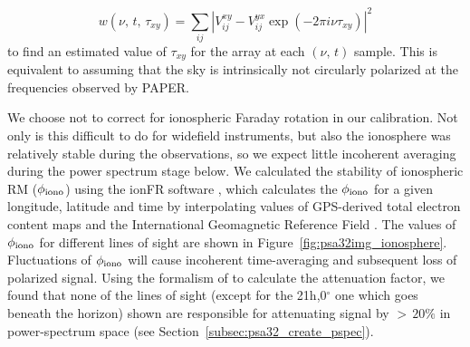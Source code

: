 \begin{equation}
w(\nu,\,t,\,\tau_{xy}) = \sum_{ij} | V_{ij}^{xy} - V_{ij}^{yx}\exp(-2\pi i \nu \tau_{xy}) |^2
\end{equation}
to find an estimated value of $\tau_{xy}$ for the array at each $(\nu,\,t)$ sample. This is equivalent to assuming that the sky is intrinsically not circularly polarized at the frequencies observed by PAPER.

We choose not to correct for ionospheric Faraday rotation in our calibration. Not only is this difficult to do for widefield instruments, but also the ionosphere was relatively stable during the observations, so we expect little incoherent averaging during the power spectrum stage below. We calculated the stability of ionospheric RM ($\phi_{\rm iono}$) using the {\sc ionFR} software \citep{Sotomayor-Beltran.13}, which calculates the $\phi_{\rm iono}$ for a given longitude, latitude and time by interpolating values of GPS-derived total electron content maps and the International Geomagnetic Reference Field \citep{Finlay.10}. The values of $\phi_{\rm iono}$ for different lines of sight are shown in Figure~\ref{fig:psa32img_ionosphere}. 
Fluctuations of $\phi_{\rm iono}$ will cause incoherent time-averaging and subsequent loss of polarized signal. Using the formalism of \citet{Moore.15} to calculate the attenuation factor, we found that none of the lines of sight (except for the 21h,0$^{\circ}$ one which goes beneath the horizon) shown are responsible for attenuating signal by $>\,20\%$ in power-spectrum space (see Section~\ref{subsec:psa32_create_pspec}).


